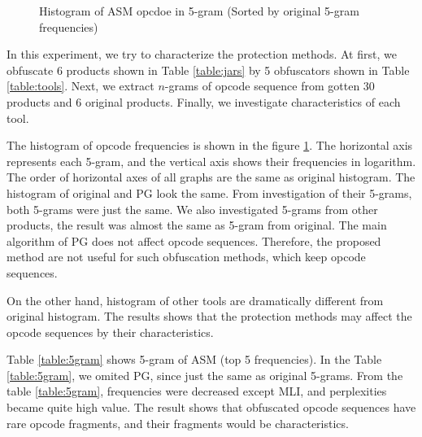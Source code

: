 \documentclass[conference]{IEEEtran}
\begin{document}
\begin{figure}[bt]
\begin{minipage}[b]{0.48\linewidth}
    \label{fig:asm-5gram-PG-histogram}%
  \end{minipage}
  \caption{Histogram of ASM opcdoe in 5-gram (Sorted by original 5-gram frequencies)}
  \label{fig:asm-5gram-histogram}
\end{figure}

In this experiment, we try to characterize the protection methods.  At
first, we obfuscate 6 products shown in Table \ref{table:jars} by 5
obfuscators shown in Table \ref{table:tools}.  Next, we extract
$n$-grams of opcode sequence from gotten 30 products and 6 original
products.  Finally, we investigate characteristics of each tool.

The histogram of opcode frequencies is shown in the figure
\ref{fig:asm-5gram-histogram}.  The horizontal axis represents each
5-gram, and the vertical axis shows their frequencies in logarithm.
The order of horizontal axes of all graphs are the same as original
histogram.
%
The histogram of original and PG look the same.  From investigation
of their 5-grams, both 5-grams were just the same.  We also
investigated 5-grams from other products, the result was almost the
same as 5-gram from original.  The main algorithm of PG does not
affect opcode sequences.  Therefore, the proposed method are not
useful for such obfuscation methods, which keep opcode sequences.

On the other hand, histogram of other tools are dramatically different
from original histogram.  The results shows that the protection
methods may affect the opcode sequences by their characteristics.

Table \ref{table:5gram} shows 5-gram of ASM (top 5 frequencies).  In
the Table \ref{table:5gram}, we omited PG, since just the same as
original 5-grams.  From the table \ref{table:5gram}, frequencies were
decreased except MLI, and perplexities became quite high value.  The
result shows that obfuscated opcode sequences have rare opcode
fragments, and their fragments would be characteristics.
\end{document}
